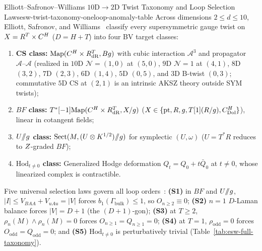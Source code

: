 \begin{zkmodule}{Elliott--Safronov--Williams $10\mathrm{D}\to 2\mathrm{D}$ Twist Taxonomy and Loop Selection Laws}{esw-twist-taxonomy-oneloop-anomaly-table}
Across dimensions $2 \le d \le 10$, Elliott, Safronov, and Williams~\cite{ESW} classify every supersymmetric gauge twist on $X = R^T\times C^H$ ($D = H+T$) into four BV target classes:
\begin{enumerate}[label=(\roman*),leftmargin=*]
  \item \textbf{CS class:} $\mathrm{Map}(C^H\times R^T_{\mathrm{dR}}, Bg)$ with cubic interaction $\mathcal{A}^3$ and propagator $\mathcal{A}\text{--}\mathcal{A}$ (realized in $10\mathrm{D}$ $\mathcal{N}=(1,0)$ at $(5,0)$, $9\mathrm{D}$ $\mathcal{N}=1$ at $(4,1)$, $8\mathrm{D}$ $(3,2)$, $7\mathrm{D}$ $(2,3)$, $6\mathrm{D}$ $(1,4)$, $5\mathrm{D}$ $(0,5)$, and $3\mathrm{D}$ B-twist $(0,3)$; commutative $5\mathrm{D}$ CS at $(2,1)$ is an intrinsic AKSZ theory outside SYM twists);
  \item \textbf{$BF$ class:} $T^*[-1]\mathrm{Map}(C^H\times R^T_{\mathrm{dR}}, X/g)$ ($X \in \{\mathrm{pt}, R, g, T[1](R/g), C^H_{\mathrm{Dol}}\}$), linear in cotangent fields;
  \item \textbf{$U/\mkern-6mu/g$ class:} $\mathrm{Sect}(M, (U\otimes K^{1/2})/\mkern-6mu/g)$ for symplectic $(U,\omega)$ ($U = T^*R$ reduces to $Z$-graded $BF$);
  \item \textbf{$\mathrm{Hod}_{t\neq 0}$ class:} Generalized Hodge deformation $Q_t = Q_0 + t\bar{Q}_0$ at $t \neq 0$, whose linearized complex is contractible.
\end{enumerate}
Five universal selection laws govern all loop orders~\cite{Repo9e833c8}: \textbf{(S1)} in $BF$ and $U/\mkern-6mu/g$, $|I| \le V_{BAA} + V_{uAu} = |V|$ forces $b_1(\Gamma_{\mathrm{bulk}}) \le 1$, so $O_{n\ge 2} \equiv 0$; \textbf{(S2)} $n=1$ $D$-Laman balance forces $|V| = D + 1$ (the $(D+1)$-gon); \textbf{(S3)} at $T \ge 2$, $\rho_n(M)\wedge\rho_n(M) = 0$ forces $O_{n\ge 1} = Q_{n\ge 1} = 0$; \textbf{(S4)} at $T = 1$, $\rho_{\mathrm{odd}} = 0$ forces $O_{\mathrm{odd}} = Q_{\mathrm{odd}} = 0$; and \textbf{(S5)} $\mathrm{Hod}_{t\neq 0}$ is perturbatively trivial (Table~\ref{tab:esw-full-taxonomy}).
\end{zkmodule}

